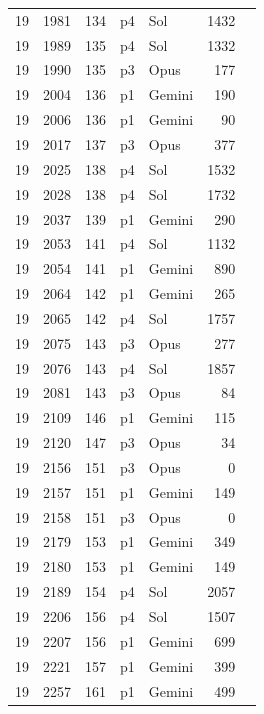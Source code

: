 \begin{longtable}{r r r l l r L{2.2in}}
19 & 1981 & 134 & p4 & Sol & 1432 &  \\
19 & 1989 & 135 & p4 & Sol & 1332 &  \\
19 & 1990 & 135 & p3 & Opus & 177 &  \\
19 & 2004 & 136 & p1 & Gemini & 190 &  \\
19 & 2006 & 136 & p1 & Gemini & 90 &  \\
19 & 2017 & 137 & p3 & Opus & 377 &  \\
19 & 2025 & 138 & p4 & Sol & 1532 &  \\
19 & 2028 & 138 & p4 & Sol & 1732 &  \\
19 & 2037 & 139 & p1 & Gemini & 290 &  \\
19 & 2053 & 141 & p4 & Sol & 1132 &  \\
19 & 2054 & 141 & p1 & Gemini & 890 &  \\
19 & 2064 & 142 & p1 & Gemini & 265 &  \\
19 & 2065 & 142 & p4 & Sol & 1757 &  \\
19 & 2075 & 143 & p3 & Opus & 277 &  \\
19 & 2076 & 143 & p4 & Sol & 1857 &  \\
19 & 2081 & 143 & p3 & Opus & 84 &  \\
19 & 2109 & 146 & p1 & Gemini & 115 &  \\
19 & 2120 & 147 & p3 & Opus & 34 &  \\
19 & 2156 & 151 & p3 & Opus & 0 &  \\
19 & 2157 & 151 & p1 & Gemini & 149 &  \\
19 & 2158 & 151 & p3 & Opus & 0 &  \\
19 & 2179 & 153 & p1 & Gemini & 349 &  \\
19 & 2180 & 153 & p1 & Gemini & 149 &  \\
19 & 2189 & 154 & p4 & Sol & 2057 &  \\
19 & 2206 & 156 & p4 & Sol & 1507 &  \\
19 & 2207 & 156 & p1 & Gemini & 699 &  \\
19 & 2221 & 157 & p1 & Gemini & 399 &  \\
19 & 2257 & 161 & p1 & Gemini & 499 &  \\

\end{longtable}
